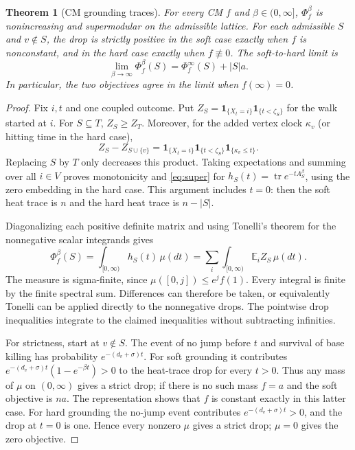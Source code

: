 \documentclass[11pt]{article}
\newtheorem{theorem}{Theorem}
\DeclareMathOperator{\tr}{tr}
\newcommand{\E}{\mathbb E}
\newcommand{\ind}{\mathbf 1}
\begin{document}
\begin{theorem}[CM grounding traces]\label{thm:cm}
For every CM $f$ and $\beta\in(0,\infty]$, $\Phi_f^\beta$ is
nonincreasing and supermodular on the admissible lattice.
For each admissible $S$ and $v\notin S$, the drop is strictly positive
in the soft case exactly when $f$ is nonconstant, and in the hard case
exactly when $f\not\equiv0$.
The soft-to-hard limit is
\begin{equation}\label{eq:hardlimit}
 \lim_{\beta\to\infty}\Phi_f^\beta(S)
 =\Phi_f^\infty(S)+|S|a.
\end{equation}
In particular, the two objectives agree in the limit when $f(\infty)=0$.
\end{theorem}
\begin{proof}
Fix $i,t$ and one coupled outcome. Put
$Z_S=\ind_{\{X_t=i\}}\ind_{\{t<\zeta_S\}}$ for the walk started at $i$.
For $S\subseteq T$, $Z_S\geq Z_T$. Moreover, for the added vertex clock
$\kappa_v$ (or hitting time in the hard case),
\[
 Z_S-Z_{S\cup\{v\}}
 =\ind_{\{X_t=i\}}\ind_{\{t<\zeta_S\}}\ind_{\{\kappa_v\leq t\}}.
\]
Replacing $S$ by $T$ only decreases this product. Taking expectations
and summing over all $i\in V$ proves monotonicity and
\eqref{eq:super} for $h_S(t)=\tr e^{-tA_S^\beta}$, using the zero
embedding in the hard case. This argument includes $t=0$: then the
soft heat trace is $n$ and the hard heat trace is $n-|S|$.

Diagonalizing each positive definite matrix and using Tonelli's theorem
for the nonnegative scalar integrands gives
\[
 \Phi_f^\beta(S)=\int_{[0,\infty)}h_S(t)\,\mu(dt)
 =\sum_i\int_{[0,\infty)}\E_i Z_S\,\mu(dt).
\]
The measure is sigma-finite, since $\mu([0,j])\leq e^j f(1)$.
Every integral is finite by the finite spectral sum. Differences can
therefore be taken, or equivalently Tonelli can be applied directly
to the nonnegative drops. The pointwise drop inequalities integrate
to the claimed inequalities without subtracting infinities.

For strictness, start at $v\notin S$. The event of no jump before $t$
and survival of base killing has probability $e^{-(d_v+\sigma)t}$.
For soft grounding it contributes
$e^{-(d_v+\sigma)t}(1-e^{-\beta t})>0$ to the heat-trace drop for
every $t>0$. Thus any mass of $\mu$ on $(0,\infty)$ gives a strict drop;
if there is no such mass $f=a$ and the soft objective is $na$.
The representation shows that $f$ is constant exactly in this latter
case. For hard grounding the no-jump event contributes
$e^{-(d_v+\sigma)t}>0$, and the drop at $t=0$ is one. Hence every
nonzero $\mu$ gives a strict drop; $\mu=0$ gives the zero objective.


\end{proof}
\end{document}
